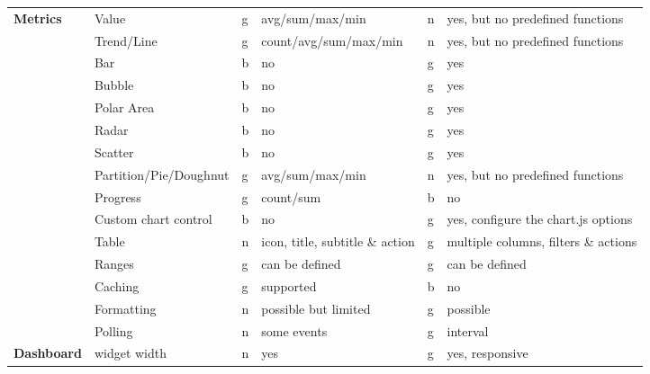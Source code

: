 \begin{table}[]
{\begin{tabular}{llllll}
            \multirow{15}{*}{\textbf{Metrics}}       & Value                  & g  & avg/sum/max/min                & n  & yes, but no predefined functions        \\
            & Trend/Line             & g  & count/avg/sum/max/min          & n  & yes, but no predefined functions        \\
            & Bar                    & b  & no                             & g  & yes                                     \\
            & Bubble                 & b  & no                             & g  & yes                                     \\
            & Polar Area             & b  & no                             & g  & yes                                     \\
            & Radar                  & b  & no                             & g  & yes                                     \\
            & Scatter                & b  & no                             & g  & yes                                     \\
            & Partition/Pie/Doughnut & g  & avg/sum/max/min                & n  & yes, but no predefined functions        \\
            & Progress               & g  & count/sum                      & b  & no                                      \\
            & Custom chart control   & b  & no                             & g  & yes, configure the chart.js options     \\
            & Table                  & n  & icon, title, subtitle \& action & g  & multiple columns, filters \& actions     \\
            & Ranges                 & g  & can be defined                 & g  & can be defined                          \\
            & Caching                & g  & supported                      & b  & no                                      \\
            & Formatting             & n  & possible but limited           & g  & possible                                \\
            & Polling                & n  & some events                    & g  & interval                                \\
            \hline
            \multirow{3}{*}{\textbf{Dashboard}}      & widget width           & n  & yes                            & g  & yes, responsive                         \\

\end{tabular}}
\end{table}
